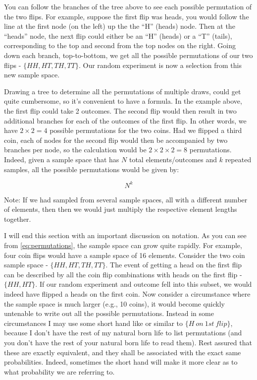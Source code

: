 \documentclass[
]{book}
\theoremstyle{definition}
\theoremstyle{definition}
\theoremstyle{definition}
\theoremstyle{definition}
\theoremstyle{remark}
\begin{document}
You can follow the branches of the tree above to see each possible permutation of the two flips. For example, suppose the first flip was heads, you would follow the line at the first node (on the left) up the the ``H'' (heads) node. Then at the ``heads'' node, the next flip could either be an ``H'' (heads) or a ``T'' (tails), corresponding to the top and second from the top nodes on the right. Going down each branch, top-to-bottom, we get all the possible permutations of our two flips - \(\{HH,HT,TH,TT\}\). Our random experiment is now a selection from this new sample space.

Drawing a tree to determine all the permutations of multiple draws, could get quite cumbersome, so it's convenient to have a formula. In the example above, the first flip could take 2 outcomes. The second flip would then result in two additional branches for each of the outcomes of the first flip. In other words, we have \(2 \times 2 = 4\) possible permutations for the two coins. Had we flipped a third coin, each of nodes for the second flip would then be accompanied by two branches per node, so the calculation would be \(2 \times 2 \times 2 = 8\) permutations. Indeed, given a sample space that has \(N\) total elements/outcomes and \(k\) repeated samples, all the possible permutations would be given by:

\[ N^k
\label{eq:permutations}\]

Note: If we had sampled from several sample spaces, all with a different number of elements, then then we would just multiply the respective element lengths together.

I will end this section with an important discussion on notation. As you can see from \eqref{eq:permutations}, the sample space can grow quite rapidly. For example, four coin flips would have a sample space of 16 elements. Consider the two coin sample space - \(\{HH,HT,TH,TT\}\). The event of getting a head on the first flip can be described by all the coin flip combinations with heads on the first flip - \(\{HH,HT\}\). If our random experiment and outcome fell into this subset, we would indeed have flipped a heads on the first coin. Now consider a circumstance where the sample space is much larger (e.g., 10 coins), it would become quickly untenable to write out all the possible permutations. Instead in some circumstances I may use some short hand like or similar to \(\{H \: on \: 1st \: flip\}\), because I don't have the rest of my natural born life to list permutations (and you don't have the rest of your natural born life to read them). Rest assured that these are exactly equivalent, and they shall be associated with the exact same probabilities. Indeed, sometimes the short hand will make it more clear as to what probability we are referring to.
\end{document}
